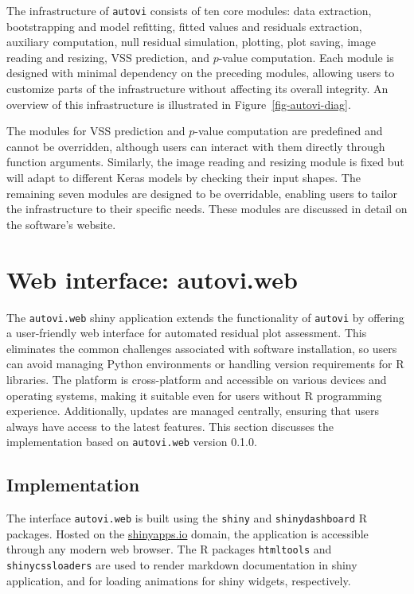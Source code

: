 \documentclass[
doublespace,
  times]{anzsauth}
\begin{document}
The infrastructure of \texttt{autovi} consists of ten core modules: data
extraction, bootstrapping and model refitting, fitted values and
residuals extraction, auxiliary computation, null residual simulation,
plotting, plot saving, image reading and resizing, VSS prediction, and
\(p\)-value computation. Each module is designed with minimal dependency
on the preceding modules, allowing users to customize parts of the
infrastructure without affecting its overall integrity. An overview of
this infrastructure is illustrated in Figure~\ref{fig-autovi-diag}.

The modules for VSS prediction and \(p\)-value computation are
predefined and cannot be overridden, although users can interact with
them directly through function arguments. Similarly, the image reading
and resizing module is fixed but will adapt to different Keras models by
checking their input shapes. The remaining seven modules are designed to
be overridable, enabling users to tailor the infrastructure to their
specific needs. These modules are discussed in detail on the software's
website.

\section{Web interface: autovi.web}\label{sec-autovi-web}

The \texttt{autovi.web} shiny application extends the functionality of
\texttt{autovi} by offering a user-friendly web interface for automated
residual plot assessment. This eliminates the common challenges
associated with software installation, so users can avoid managing
Python environments or handling version requirements for R libraries.
The platform is cross-platform and accessible on various devices and
operating systems, making it suitable even for users without R
programming experience. Additionally, updates are managed centrally,
ensuring that users always have access to the latest features. This
section discusses the implementation based on \texttt{autovi.web}
version 0.1.0.

\subsection{Implementation}\label{implementation}

The interface \texttt{autovi.web} is built using the \texttt{shiny}
\citep{shiny} and \texttt{shinydashboard} \citep{shinydashboard} R
packages. Hosted on the \href{https://www.shinyapps.io}{shinyapps.io}
domain, the application is accessible through any modern web browser.
The R packages \texttt{htmltools} \citep{htmltools} and
\texttt{shinycssloaders} \citep{shinycssloaders} are used to render
markdown documentation in shiny application, and for loading animations
for shiny widgets, respectively.
\end{document}

